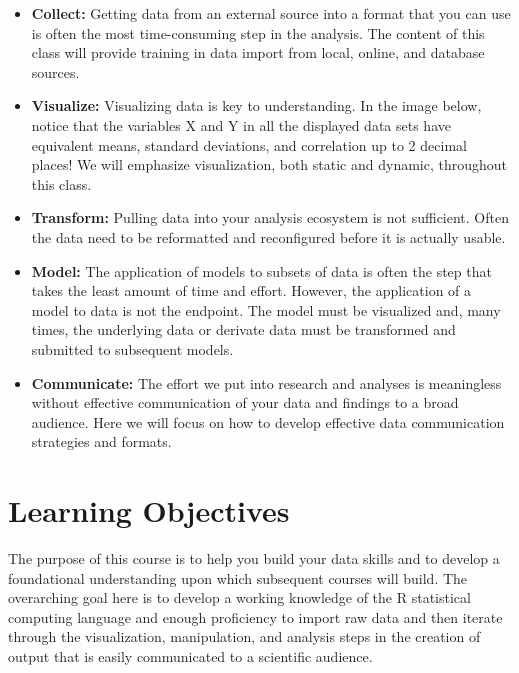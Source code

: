 \documentclass[
  letterpaper,
]{book}
\providecommand{\tightlist}{%
  \setlength{\itemsep}{0pt}\setlength{\parskip}{0pt}}
\begin{document}
\begin{itemize}
\tightlist
\item
  \textbf{Collect:} Getting data from an external source into a format
  that you can use is often the most time-consuming step in the
  analysis. The content of this class will provide training in data
  import from local, online, and database sources.\\
\item
  \textbf{Visualize:} Visualizing data is key to understanding. In the
  image below, notice that the variables X and Y in all the displayed
  data sets have equivalent means, standard deviations, and correlation
  up to 2 decimal places! We will emphasize visualization, both static
  and dynamic, throughout this class.
\item
  \textbf{Transform:} Pulling data into your analysis ecosystem is not
  sufficient. Often the data need to be reformatted and reconfigured
  before it is actually usable.
\item
  \textbf{Model:} The application of models to subsets of data is often
  the step that takes the least amount of time and effort. However, the
  application of a model to data is not the endpoint. The model must be
  visualized and, many times, the underlying data or derivate data must
  be transformed and submitted to subsequent models.
\item
  \textbf{Communicate:} The effort we put into research and analyses is
  meaningless without effective communication of your data and findings
  to a broad audience. Here we will focus on how to develop effective
  data communication strategies and formats.
\end{itemize}

\section*{Learning Objectives}\label{learning-objectives}


The purpose of this course is to help you build your data skills and to
develop a foundational understanding upon which subsequent courses will
build. The overarching goal here is to develop a working knowledge of
the R statistical computing language and enough proficiency to import
raw data and then iterate through the visualization, manipulation, and
analysis steps in the creation of output that is easily communicated to
a scientific audience.
\end{document}
